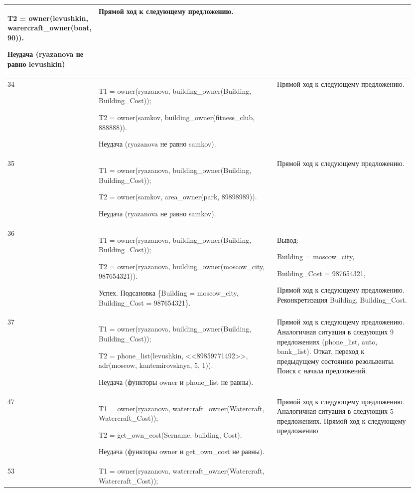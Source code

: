 \documentclass[a4paper,12pt]{article}
\begin{document}
\begin{center}
\begin{longtable}[h!]{|p{0.05\linewidth}|p{0.5\linewidth}|p{ 0.4\linewidth}|}
{				T2 =  owner(levushkin, warercraft\_owner(boat, 90)).
				
				Неудача (ryazanova не равно levushkin)} & {Прямой ход к следующему предложению.}\\
			\hline
			{34} & {T1 = owner(ryazanova, building\_owner(Building, Building\_Cost));
				
				T2 =  owner(samkov, building\_owner(fitness\_club, 888888)).
				
				Неудача (ryazanova не равно samkov).} & {Прямой ход к следующему предложению.}\\
			\hline
			{35} & {T1 = owner(ryazanova, building\_owner(Building, Building\_Cost));
				
				T2 =  owner(samkov, area\_owner(park, 89898989)).
				
				Неудача (ryazanova не равно samkov).} & {Прямой ход к следующему предложению.}\\
			\hline
			{36} & {T1 = owner(ryazanova, building\_owner(Building, Building\_Cost));
				
				T2 =  owner(ryazanova, building\_owner(moscow\_city, 987654321)).
				
				Успех. Подсановка \{Building = moscow\_city, Building\_Cost = 987654321\}.} & {Вывод:
				
				Building = moscow\_city,
				
				Building\_Cost = 987654321,
				
				Прямой ход к следующему предложению. Реконкретизация Building, Building\_Cost.}\\
			\hline
			{37} & {T1 = owner(ryazanova, building\_owner(Building, Building\_Cost));
				
				T2 =  phone\_list(levushkin, <<89859771492>>, adr(moscow, kantemirovskaya, 5, 1)).
				
				Неудача (функторы owner и phone\_list не равны).} & {Прямой ход к следующему предложению. Аналогичная ситуация в следующих 9 предложениях (phone\_list, auto, bank\_list). Откат, переход к предыдущему состоянию резольвенты. Поиск с начала предложений.}\\
			\hline
			{47} & {T1 = owner(ryazanova, watercraft\_owner(Watercraft, Watercraft\_Cost));
				
				T2 = get\_own\_cost(Sername, building, Cost).
				
				Неудача (функторы owner и get\_own\_cost не равны).} & {Прямой ход к следующему предложению. Аналогичная ситуация в следующих 5 предложениях. Прямой ход к следующему предложению}\\
			\hline
			{53} & {T1 = owner(ryazanova, watercraft\_owner(Watercraft, Watercraft\_Cost));
				
}
\end{longtable}
\end{center}
\end{document}

